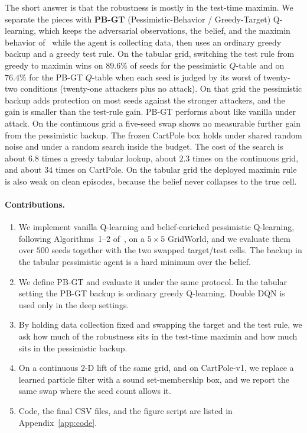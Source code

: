 \documentclass[10pt,twocolumn]{article}
\begin{document}
The short answer is that the robustness is mostly in the test-time maximin.
We separate the pieces with \textbf{PB-GT} (Pessimistic-Behavior / Greedy-Target) Q-learning, which keeps the adversarial observations, the belief, and the maximin behavior of~\cite{sun2024belief} while the agent is collecting data, then uses an ordinary greedy backup and a greedy test rule.
On the tabular grid, switching the test rule from greedy to maximin wins on $89.6\%$ of seeds for the pessimistic $Q$-table and on $76.4\%$ for the PB-GT $Q$-table when each seed is judged by its worst of twenty-two conditions (twenty-one attackers plus no attack).
On that grid the pessimistic backup adds protection on most seeds against the stronger attackers, and the gain is smaller than the test-rule gain.
PB-GT performs about like vanilla under attack.
On the continuous grid a five-seed swap shows no measurable further gain from the pessimistic backup.
The frozen CartPole box holds under shared random noise and under a random search inside the budget.
The cost of the search is about $6.8$ times a greedy tabular lookup, about $2.3$ times on the continuous grid, and about $34$ times on CartPole.
On the tabular grid the deployed maximin rule is also weak on clean episodes, because the belief never collapses to the true cell.

\paragraph{Contributions.}
\begin{enumerate}[leftmargin=1.4em]
\item We implement vanilla Q-learning and belief-enriched pessimistic Q-learning, following Algorithms~1--2 of~\cite{sun2024belief}, on a $5{\times}5$ GridWorld, and we evaluate them over $500$ seeds together with the two swapped target/test cells.
The backup in the tabular pessimistic agent is a hard minimum over the belief.
\item We define PB-GT and evaluate it under the same protocol.
In the tabular setting the PB-GT backup is ordinary greedy Q-learning.
Double DQN is used only in the deep settings.
\item By holding data collection fixed and swapping the target and the test rule, we ask how much of the robustness sits in the test-time maximin and how much sits in the pessimistic backup.
\item On a continuous $2$-D lift of the same grid, and on CartPole-v1, we replace a learned particle filter with a sound set-membership box, and we report the same swap where the seed count allows it.
\item Code, the final CSV files, and the figure script are listed in Appendix~\ref{app:code}.
\end{enumerate}
\end{document}
